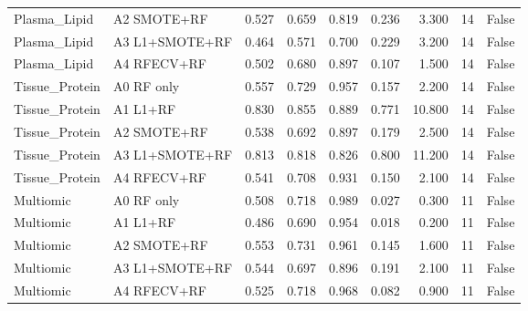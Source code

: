 \begin{table}[t]
\begin{tabular}{llrrrrrrr}
Plasma\_Lipid & A2 SMOTE+RF & 0.527 & 0.659 & 0.819 & 0.236 & 3.300 & 14 & False \\
Plasma\_Lipid & A3 L1+SMOTE+RF & 0.464 & 0.571 & 0.700 & 0.229 & 3.200 & 14 & False \\
Plasma\_Lipid & A4 RFECV+RF & 0.502 & 0.680 & 0.897 & 0.107 & 1.500 & 14 & False \\
Tissue\_Protein & A0 RF only & 0.557 & 0.729 & 0.957 & 0.157 & 2.200 & 14 & False \\
Tissue\_Protein & A1 L1+RF & 0.830 & 0.855 & 0.889 & 0.771 & 10.800 & 14 & False \\
Tissue\_Protein & A2 SMOTE+RF & 0.538 & 0.692 & 0.897 & 0.179 & 2.500 & 14 & False \\
Tissue\_Protein & A3 L1+SMOTE+RF & 0.813 & 0.818 & 0.826 & 0.800 & 11.200 & 14 & False \\
Tissue\_Protein & A4 RFECV+RF & 0.541 & 0.708 & 0.931 & 0.150 & 2.100 & 14 & False \\
Multiomic & A0 RF only & 0.508 & 0.718 & 0.989 & 0.027 & 0.300 & 11 & False \\
Multiomic & A1 L1+RF & 0.486 & 0.690 & 0.954 & 0.018 & 0.200 & 11 & False \\
Multiomic & A2 SMOTE+RF & 0.553 & 0.731 & 0.961 & 0.145 & 1.600 & 11 & False \\
Multiomic & A3 L1+SMOTE+RF & 0.544 & 0.697 & 0.896 & 0.191 & 2.100 & 11 & False \\
Multiomic & A4 RFECV+RF & 0.525 & 0.718 & 0.968 & 0.082 & 0.900 & 11 & False \\
\hline
\end{tabular}
\end{table}
